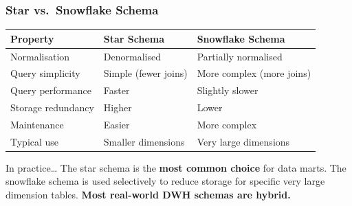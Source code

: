 \begin{frame}
  \frametitle{Star vs.\ Snowflake Schema}

  \begin{tabularx}{\linewidth}{@{}l X X@{}}
    \toprule
    \textbf{Property}    & \textbf{Star Schema}        & \textbf{Snowflake Schema} \\
    \midrule
    Normalisation        & Denormalised                & Partially normalised \\
    Query simplicity     & Simple (fewer joins)        & More complex (more joins) \\
    Query performance    & Faster                      & Slightly slower \\
    Storage redundancy   & Higher                      & Lower \\
    Maintenance          & Easier                      & More complex \\
    Typical use          & Smaller dimensions          & Very large dimensions \\
    \bottomrule
  \end{tabularx}

  \vspace{0.5em}
  \begin{block}{In practice\ldots}
    The star schema is the \textbf{most common choice} for data marts.
    The snowflake schema is used selectively to reduce storage for
    specific very large dimension tables.
    \textbf{Most real-world DWH schemas are hybrid.}
  \end{block}
\end{frame}


